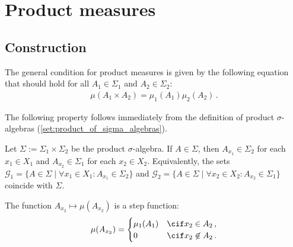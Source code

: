 \section{Product measures}
\subsection{Construction}

    The general condition for product measures is given by the following equation that should hold for all $A_1\in\Sigma_1$ and $A_2\in\Sigma_2$:
    \begin{gather}
        \label{measure:general_condition}
        \mu(A_1\times A_2) = \mu_1(A_1)\mu_2(A_2)\,.
    \end{gather}

    The following property follows immediately from the definition of product $\sigma$-algebras (\cref{set:product_of_sigma_algebras}).
    \begin{property}
        Let $\Sigma := \Sigma_1\times\Sigma_2$ be the product $\sigma$-algebra. If $A\in\Sigma$, then $A_{x_1}\in\Sigma_2$ for each $x_1\in X_1$ and $A_{x_2}\in\Sigma_1$ for each $x_2\in X_2$. Equivalently, the sets $\mathcal{G}_1 = \{A\in\Sigma\mid\forall x_1\in X_1:A_{x_1}\in\Sigma_2\}$ and $\mathcal{G}_2 = \{A\in\Sigma\mid\forall x_2\in X_2: A_{x_2}\in\Sigma_1\}$ coincide with $\Sigma$.
    \end{property}

    \begin{property}
        The function $A_{x_2}\mapsto\mu(A_{x_2})$ is a step function:
        \begin{gather*}
            \mu(A_{x_2}) =
            \begin{cases}
                \mu_1(A_1)&\cif x_2\in A_2\,,\\
                0&\cif x_2\not\in A_2\,.
            \end{cases}
        \end{gather*}
    \end{property}

